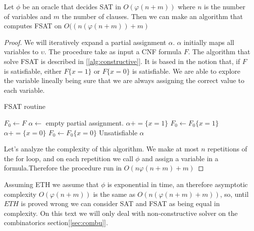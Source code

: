   \begin{proposition}
    Let $\phi$ be an oracle that decides SAT in $O(\varphi(n+m))$ where $n$ is the number of variables and $m$ the number of clauses. Then we can make an algorithm  that computes FSAT on $O((n(\varphi(n+m))+m)$ 
  \end{proposition}
  \begin{proof}
    We will iteratively expand a partial assignment $\alpha$. $\alpha$ initially maps all variables to $\upsilon$. The procedure take as input a CNF formula $F$. The algorithm that solve FSAT is described in [\ref{alg:constructive}]. It is based in the notion that, if  $F$ is satisfiable, either $F\{x=1\}$ or $F\{x=0\}$ is satisfiable. We are able to explore the variable lineally being sure that we are always assigning the correct value to each variable. 

    
    \begin{algorithm}
  \caption{FSAT routine}\label{alg:constructive}
  \begin{algorithmic}[1]

    
  \State $F_0 \gets F$
  \State $\alpha \gets$ empty partial assignment.
  \State
    \State $\alpha += \{x = 1\}$
    \State $F_0 \gets F_0\{x=1\}$
    \Else {} 
    \State $\alpha += \{x = 0\}$
    \State $F_0 \gets F_0\{x=0\}$
    \Else
    \State \Retun Unsatisfiable
    \EndIf
    \EndIf
    \EndFor
    \State \Return $\alpha$
  \end{algorithmic}
\end{algorithm}

Let's analyze the complexity of this algorithm. We make at most $n$ repetitions of the for loop, and on each repetition we call $\phi$ and assign a variable in a formula.Therefore the procedure run in $O(n\varphi(n+m)+m)$
\end{proof}

Assuming ETH we assume that $\phi$ is exponential in time, an therefore asymptotic complexity $O(\varphi(n+m))$ is the same as $O(n(\varphi(n+m)+m))$, so, until $ETH$ is proved wrong we can consider SAT and FSAT as being equal in complexity. On this text we will only deal with non-constructive  solver on the combinatorics section[\ref{sec:combu}].



